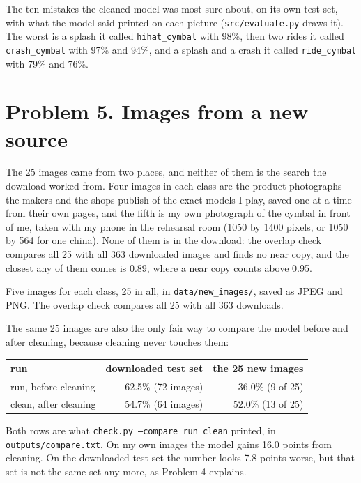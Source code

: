 \documentclass[11pt]{article}
\begin{document}
The ten mistakes the cleaned model was most sure about, on its own test set, with
what the model said printed on each picture (\texttt{src/evaluate.py} draws it).
The worst is a splash it called \texttt{hihat\_cymbal} with 98\%, then two rides it
called \texttt{crash\_cymbal} with 97\% and 94\%, and a splash and a crash it
called \texttt{ride\_cymbal} with 79\% and 76\%.

\section*{Problem 5. Images from a new source}

The 25 images came from two places, and neither of them is the search the
download worked from. Four images in each class are the product photographs the
makers and the shops publish of the exact models I play, saved one at a time
from their own pages, and the fifth is my own photograph of the cymbal in front
of me, taken with my phone in the rehearsal room (1050 by 1400 pixels, or 1050
by 564 for one china). None of them is in the download: the overlap check
compares all 25 with all 363 downloaded images and finds no near copy, and the
closest any of them comes is 0.89, where a near copy counts above 0.95.

Five images for each class, 25 in all, in \texttt{data/new\_images/}, saved as
JPEG and PNG. The overlap check compares all 25 with all 363 downloads.


The same 25 images are also the only fair way to compare the model before and
after cleaning, because cleaning never touches them:

\begin{center}\footnotesize
\begin{tabular}{lrr}
\toprule
run & downloaded test set & the 25 new images \\
\midrule
run, before cleaning    & 62.5\% (72 images) & 36.0\% (9 of 25) \\
clean, after cleaning   & 54.7\% (64 images) & 52.0\% (13 of 25) \\
\bottomrule
\end{tabular}
\end{center}

Both rows are what \texttt{check.py --compare run clean} printed, in
\texttt{outputs/compare.txt}. On my own images the model gains 16.0 points from
cleaning. On the downloaded test set the number looks 7.8 points worse, but
that set is not the same set any more, as Problem 4 explains.
\end{document}
